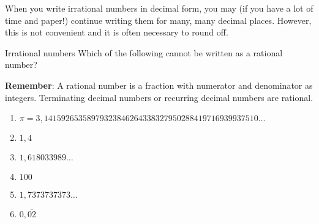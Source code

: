 When you write irrational numbers in decimal form, you may (if you
have a lot of time and paper!) continue writing them for many, many
decimal places. However, this is not convenient and it is often
necessary to round off.


\begin{activity}{Irrational numbers }
\nopagebreak
Which of the following cannot be
written as a rational number?\par \vspace{0.5cm}
\textbf{Remember}: A rational number is a fraction with numerator and denominator as integers. Terminating decimal numbers or recurring decimal numbers are rational.\par 
\begin{enumerate}[itemsep=5pt, label=\textbf{\arabic*}. ] 
\item $\pi =3,14159265358979323846264338327950288419716939937510\ldots$
\item $1,4$
\item $1,618033989\ldots$
\item $100$
\item $1,7373737373\ldots$
\item $0,\overline{02}$
\end{enumerate}
\end{activity}


